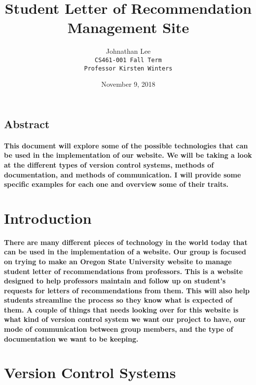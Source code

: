 \documentclass[letterpaper, 10pt, draftclsnofoot, onecolumn, IEEETran]{article}
\title{Student Letter of Recommendation Management Site}
\author{Johnathan Lee \\ {\tt CS461-001 Fall Term} \\ {\tt Professor Kirsten Winters}}
\date{November 9, 2018}
\begin{document}
\maketitle

\noindent
\subsection*{Abstract}

\paragraph{This document will explore some of the possible technologies that can be used in the implementation of our website. We will be taking a look at the different types of version control systems, methods of documentation, and methods of communication. I will provide some specific examples for each one and overview some of their traits.} 
\newpage


\section*{Introduction}
\paragraph{There are many different pieces of technology in the world today that can be used in the implementation of a website. Our group is focused on trying to make an Oregon State University website to manage student letter of recommendations from professors. This is a website designed to help professors maintain and follow up on student's requests for letters of recommendations from them. This will also help students streamline the process so they know what is expected of them. A couple of things that needs looking over for this website is what kind of version control system we want our project to have, our mode of communication between group members, and the type of documentation we want to be keeping.}
\section*{Version Control Systems}
\end{document}
